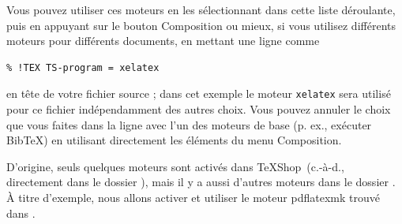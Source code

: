 \documentclass[11pt,french]{article}
\newcommand{\TS}{\textsf{\TeX Shop}}
\newcommand{\cmd}[1]{\textsf{#1}}
\newcommand{\mnu}[1]{\textsf{#1}}
\begin{document}
Vous pouvez utiliser ces moteurs en les sélectionnant dans cette liste déroulante, puis en appuyant sur le bouton \mnu{Composition} ou mieux, si vous utilisez différents moteurs pour différents documents, en mettant une ligne comme

%
\begin{verbatim}
% !TEX TS-program = xelatex
\end{verbatim}
en tête de votre fichier source ; dans cet exemple le moteur \texttt{xelatex} sera utilisé pour ce fichier indépendamment des autres choix. Vous pouvez annuler le choix que vous faites dans la ligne avec l'un des moteurs de base (p. ex., exécuter \mnu{BibTeX}) en utilisant directement les éléments du menu \mnu{Composition}.


D'origine, seuls quelques moteurs sont activés dans \TS\ (c.-à-d., directement dans le dossier ), mais il y a aussi d'autres moteurs dans le dossier . À titre d'exemple, nous allons activer et utiliser le moteur \cmd{pdflatexmk} trouvé dans .
\end{document}
